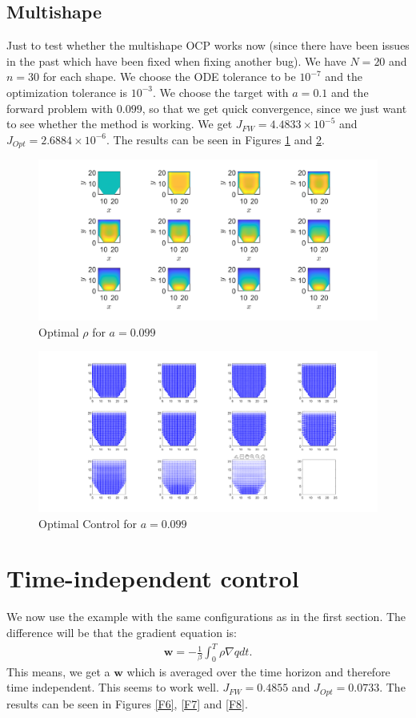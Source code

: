 \documentclass[11pt, a4paper]{article}
\theoremstyle{definition}
\newcommand{\w}{\mathbf{w}}
\begin{document}
	\subsection{Multishape}
	Just to test whether the multishape OCP works now (since there have been issues in the past which have been fixed when fixing another bug). We have $N =20$ and $n = 30$ for each shape. We choose the ODE tolerance to be $10^{-7}$ and the optimization tolerance is $10^{-3}$.
	We choose the target with $a=0.1$ and the forward problem with $0.099$, so that we get quick convergence, since we just want to see whether the method is working.
	We get $J_{FW} = 4.4833 \times 10^{-5}$ and $J_{Opt} = 2.6884 \times 10^{-6}$. The results can be seen in Figures \ref{F4} and \ref{F5}.
	\begin{figure}[h]
		\centering
		\includegraphics[scale=0.35]{M1.png}
		\caption{Optimal $\rho$ for $a = 0.099$} 
		\label{F4}
	\end{figure}
	\begin{figure}[h]
		\centering
		\includegraphics[scale=0.35]{M2.png}
		\caption{Optimal Control for $a = 0.099$} 
		\label{F5}
	\end{figure}
	
	
	\section{Time-independent control}
	We now use the example with the same configurations as in the first section. The difference will be that the gradient equation is:
	\begin{align*}
		\w = - \frac{1}{\beta}\int_0^T \rho \nabla q dt.
	\end{align*}
	This means, we get a $\w$ which is averaged over the time horizon and therefore time independent. This seems to work well. $J_{FW} = 0.4855$ and $J_{Opt} = 0.0733$. The results can be seen in Figures \ref{F6}, \ref{F7} and \ref{F8}.
	
\end{document}
